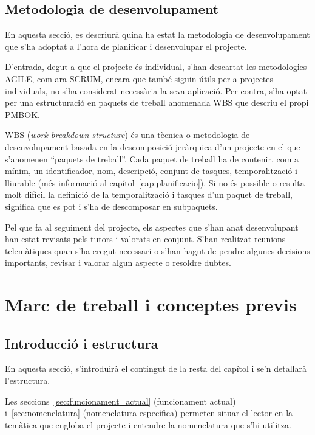 \documentclass[a4paper,12pt]{ThesisStyle}
\begin{document}
\section{Metodologia de desenvolupament}
\label{sec:metodologia_desenvolupament}

En aquesta secció, es descriurà quina ha estat la metodologia de desenvolupament que s'ha adoptat a l'hora de planificar i desenvolupar el projecte.

D'entrada, degut a que el projecte és individual, s'han descartat les metodologies AGILE, com ara SCRUM, encara que també siguin útils per a projectes individuals, no s'ha considerat necessària la seva aplicació. Per contra, s'ha optat per una estructuració en paquets de treball anomenada WBS que descriu el propi PMBOK.

WBS (\textit{work-breakdown structure}) és una tècnica o metodologia de desenvolupament basada en la descomposició jeràrquica d'un projecte en el que s'anomenen ``paquets de treball''. Cada paquet de treball ha de contenir, com a mínim, un identificador, nom, descripció, conjunt de tasques, temporalització i lliurable (més informació al capítol~\ref{cap:planificacio}). Si no és possible o resulta molt difícil la definició de la temporalització i tasques d'un paquet de treball, significa que es pot i s'ha de descomposar en subpaquets.

Pel que fa al seguiment del projecte, els aspectes que s'han anat desenvolupant han estat revisats pels tutors i valorats en conjunt. S'han realitzat reunions telemàtiques quan s'ha cregut necessari o s'han hagut de pendre algunes decisions importants, revisar i valorar algun aspecte o resoldre dubtes.


\chapter{Marc de treball i conceptes previs}
\label{cap:marcdetreball}

\section{Introducció i estructura}
\label{sec:marc_intro}

En aquesta secció, s'introduirà el contingut de la resta del capítol i se'n detallarà l'estructura.

Les seccions~\ref{sec:funcionament_actual} (funcionament actual) i~\ref{sec:nomenclatura} (nomenclatura específica) permeten situar el lector en la temàtica que engloba el projecte i entendre la nomenclatura que s'hi utilitza.
\end{document}
